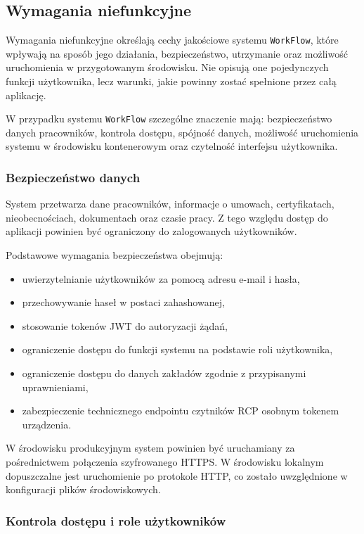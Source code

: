 \subsection{Wymagania niefunkcyjne}

Wymagania niefunkcyjne określają cechy jakościowe systemu \texttt{WorkFlow}, które wpływają na sposób jego działania, bezpieczeństwo, utrzymanie oraz możliwość uruchomienia w przygotowanym środowisku. Nie opisują one pojedynczych funkcji użytkownika, lecz warunki, jakie powinny zostać spełnione przez całą aplikację.

W przypadku systemu \texttt{WorkFlow} szczególne znaczenie mają: bezpieczeństwo danych pracowników, kontrola dostępu, spójność danych, możliwość uruchomienia systemu w środowisku kontenerowym oraz czytelność interfejsu użytkownika.

\subsubsection{Bezpieczeństwo danych}

System przetwarza dane pracowników, informacje o umowach, certyfikatach, nieobecnościach, dokumentach oraz czasie pracy. Z tego względu dostęp do aplikacji powinien być ograniczony do zalogowanych użytkowników.

Podstawowe wymagania bezpieczeństwa obejmują:
\begin{itemize}
    \item uwierzytelnianie użytkowników za pomocą adresu e-mail i hasła,
    \item przechowywanie haseł w postaci zahashowanej,
    \item stosowanie tokenów JWT do autoryzacji żądań,
    \item ograniczenie dostępu do funkcji systemu na podstawie roli użytkownika,
    \item ograniczenie dostępu do danych zakładów zgodnie z przypisanymi uprawnieniami,
    \item zabezpieczenie technicznego endpointu czytników RCP osobnym tokenem urządzenia.
\end{itemize}

W środowisku produkcyjnym system powinien być uruchamiany za pośrednictwem połączenia szyfrowanego HTTPS. W środowisku lokalnym dopuszczalne jest uruchomienie po protokole HTTP, co zostało uwzględnione w konfiguracji plików środowiskowych.

\subsubsection{Kontrola dostępu i role użytkowników}

